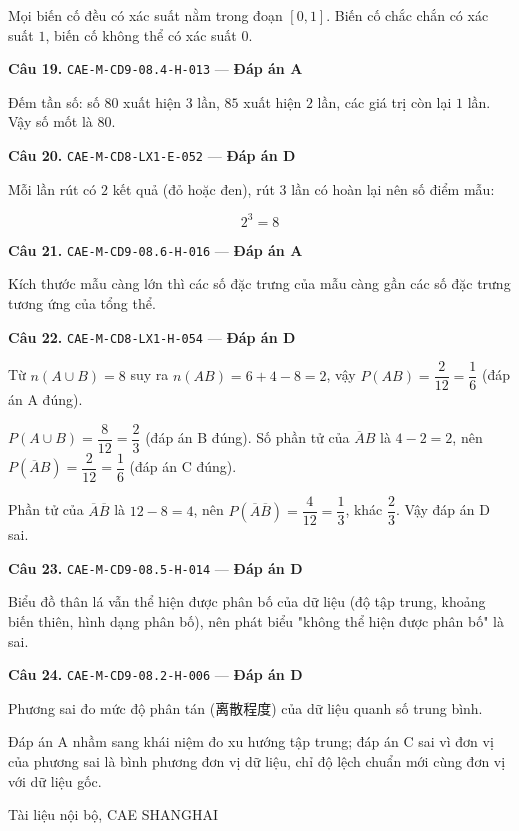 \documentclass[11pt, a4paper]{article}
\begin{document}
Mọi biến cố đều có xác suất nằm trong đoạn $[0, 1]$. Biến cố chắc chắn có xác suất $1$, biến cố không thể có xác suất $0$.

\textbf{Câu 19.} \texttt{CAE-M-CD9-08.4-H-013} — \textbf{Đáp án A}

Đếm tần số: số $80$ xuất hiện $3$ lần, $85$ xuất hiện $2$ lần, các giá trị còn lại $1$ lần. Vậy số mốt là $80$.

\textbf{Câu 20.} \texttt{CAE-M-CD8-LX1-E-052} — \textbf{Đáp án D}

Mỗi lần rút có $2$ kết quả (đỏ hoặc đen), rút $3$ lần có hoàn lại nên số điểm mẫu:

$$2^3 = 8$$

\textbf{Câu 21.} \texttt{CAE-M-CD9-08.6-H-016} — \textbf{Đáp án A}

Kích thước mẫu càng lớn thì các số đặc trưng của mẫu càng gần các số đặc trưng tương ứng của tổng thể.

\textbf{Câu 22.} \texttt{CAE-M-CD8-LX1-H-054} — \textbf{Đáp án D}

Từ $n(A \cup B) = 8$ suy ra $n(AB) = 6 + 4 - 8 = 2$, vậy $P(AB) = \dfrac{2}{12} = \dfrac{1}{6}$ (đáp án A đúng).

$P(A \cup B) = \dfrac{8}{12} = \dfrac{2}{3}$ (đáp án B đúng). Số phần tử của $\overline{A}B$ là $4 - 2 = 2$, nên $P(\overline{A}B) = \dfrac{2}{12} = \dfrac{1}{6}$ (đáp án C đúng).

Phần tử của $\overline{A}\overline{B}$ là $12 - 8 = 4$, nên $P(\overline{A}\overline{B}) = \dfrac{4}{12} = \dfrac{1}{3}$, khác $\dfrac{2}{3}$. Vậy đáp án D sai.

\textbf{Câu 23.} \texttt{CAE-M-CD9-08.5-H-014} — \textbf{Đáp án D}

Biểu đồ thân lá vẫn thể hiện được phân bố của dữ liệu (độ tập trung, khoảng biến thiên, hình dạng phân bố), nên phát biểu "không thể hiện được phân bố" là sai.

\textbf{Câu 24.} \texttt{CAE-M-CD9-08.2-H-006} — \textbf{Đáp án D}

Phương sai đo mức độ phân tán (离散程度) của dữ liệu quanh số trung bình.

 Đáp án A nhầm sang khái niệm đo xu hướng tập trung; đáp án C sai vì đơn vị của phương sai là bình phương đơn vị dữ liệu, chỉ độ lệch chuẩn mới cùng đơn vị với dữ liệu gốc.
\vspace{0.8cm}
\begin{center}
{\footnotesize\color{cae_blue} Tài liệu nội bộ, CAE SHANGHAI}
\end{center}
\end{document}
